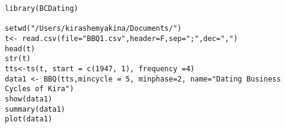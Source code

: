 \documentclass[12pt, a4paper]{article}
\begin{document}
\begin{verbatim}
library(BCDating)

setwd("/Users/kirashemyakina/Documents/")
t<- read.csv(file="BBQ1.csv",header=F,sep=";",dec=",")
head(t)
str(t)
tts<-ts(t, start = c(1947, 1), frequency =4)
data1 <- BBQ(tts,mincycle = 5, minphase=2, name="Dating Business Cycles of Kira")
show(data1)
summary(data1)
plot(data1)
\end{verbatim}
\end{document}
